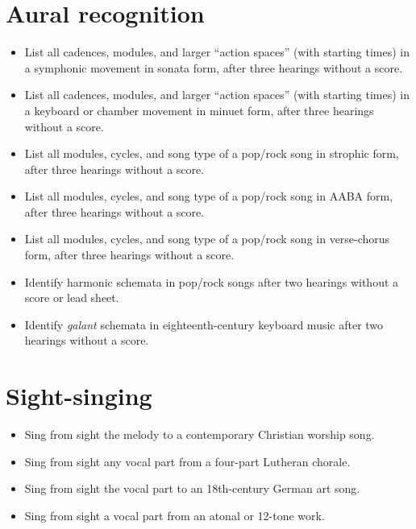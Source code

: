 \section{Aural recognition}
\label{auralrecognition}

\begin{itemize}
\item List all cadences, modules, and larger ``action spaces'' (with starting times) in a symphonic movement in sonata form, after three hearings without a score.

\item List all cadences, modules, and larger ``action spaces'' (with starting times) in a keyboard or chamber movement in minuet form, after three hearings without a score.

\item List all modules, cycles, and song type of a pop\slash rock song in strophic form, after three hearings without a score.

\item List all modules, cycles, and song type of a pop\slash rock song in AABA form, after three hearings without a score.

\item List all modules, cycles, and song type of a pop\slash rock song in verse-chorus form, after three hearings without a score.

\item Identify harmonic schemata in pop\slash rock songs after two hearings without a score or lead sheet.

\item Identify \emph{galant} schemata in eighteenth-century keyboard music after two hearings without a score.

\end{itemize}

\section{Sight-singing}
\label{sight-singing}

\begin{itemize}
\item Sing from sight the melody to a contemporary Christian worship song.

\item Sing from sight any vocal part from a four-part Lutheran chorale.

\item Sing from sight the vocal part to an 18th-century German art song.

\item Sing from sight a vocal part from an atonal or 12-tone work.

\end{itemize}

